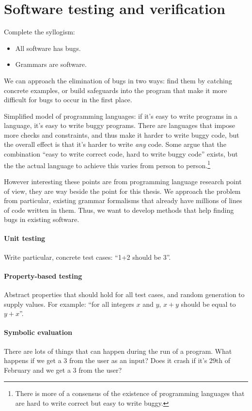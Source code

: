 \section{Software testing and verification}
\label{sec:testing-intro} 


Complete the syllogism:

\begin{itemize}
\item All software has bugs.
\item Grammars are software.
\end{itemize}

We can approach the elimination of bugs in two ways: find them by catching concrete examples, or build safeguards into the program that make it more difficult for bugs to occur in the first place.

Simplified model of programming languages: if it's easy to write programs in a language, it's easy to write buggy programs. There are languages that impose more checks and constraints, and thus make it harder to write buggy code, but the overall effect is that it's harder to write \emph{any} code. Some argue that the combination ``easy to write correct code, hard to write buggy code'' exists, but the the actual language to achieve this varies from person to person.\footnote{There is more of a consensus of the existence of programming languages that are hard to write correct but easy to write buggy.}

However interesting these points are from programming language research point of view, they are way beside the point for this thesis. We approach the problem from particular, existing grammar formalisms that already have millions of lines of code written in them. 
Thus, we want to develop methods that help finding bugs in existing software.


\paragraph{Unit testing}

Write particular, concrete test cases: ``1+2 should be 3''.


\paragraph{Property-based testing}

Abstract properties that should hold for all test cases, and random generation to supply values. For example: ``for all integers $x$ and $y$, $x+y$ should be equal to $y+x$''.

\paragraph{Symbolic evaluation}

There are lots of things that can happen during the run of a program. What happens if we get a 3 from the user as an input? Does it crash if it's 29th of February and we get a 3 from the user? 




